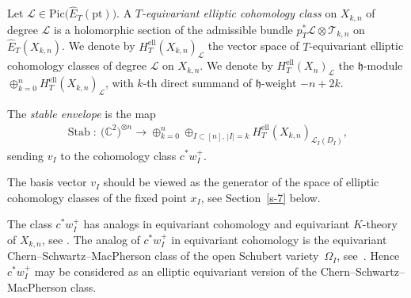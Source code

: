 \documentclass[10pt,a4paper]{amsart}
\numberwithin{equation}{section}
\begin{document}
\begin{Definition} Let $\mathcal L\in\mathrm{Pic}\big(\hat E_T(\mathrm{pt})\big)$. A {\em $T$-equivariant elliptic cohomology class} on $X_{k,n}$ of degree $\mathcal L$ is a holomorphic section of the admissible bundle $p_T^*\mathcal L\otimes \mathcal T_{k,n}$ on $\hat E_T(X_{k,n})$. We denote by $ H_T^{\mathrm{ell}}(X_{k,n})_{\mathcal L}$ the vector space of $T$-equivariant elliptic cohomology classes of degree $\mathcal L$ on $X_{k,n}$. We denote by $H_T^{\mathrm{ell}}(X_n)_{\mathcal L}$ the $\mathfrak h$-module $\oplus_{k=0}^n H_T^{\mathrm{ell}}(X_{k,n})_{\mathcal L}$, with $k$-th direct summand of $\mathfrak h$-weight $-n+2k$.
\end{Definition}
\begin{Definition} The {\em stable envelope} is the map
\begin{gather}\label{e-stable1}
 \operatorname{Stab}\colon \ \big(\mathbb{C}^2\big)^{\otimes n}\to \oplus_{k=0}^{n}\oplus_{I\subset [n],\,|I|=k} H_T^{\mathrm{ell}}(X_{k,n})_{\mathcal L_I(D_I)},
\end{gather}
sending $v_I$ to the cohomology class $c ^*w_I^+$.
\end{Definition}
\begin{Remark} The basis vector $v_I$ should be viewed as the generator of the space of elliptic cohomology classes of the fixed point $x_I$, see Section~\ref{s-7} below.
\end{Remark}
\begin{Remark} The class $c ^*w_I^+$ has analogs in equivariant cohomology and equivariant $K$-theory of $X_{k,n}$, see \cite{GRTV,RTV,RTV2}. The analog of $c ^*w_I^+$ in equivariant cohomology is the equivariant Chern--Schwartz--MacPherson class of the open Schubert variety~$\Omega_I$, see~\cite{RV1}. Hence $c ^*w_I^+$ may be considered as an elliptic equivariant version of the Chern--Schwartz--MacPherson class.
\end{Remark}
\end{document}
